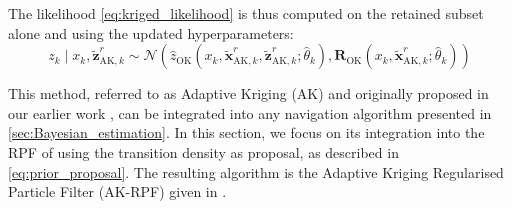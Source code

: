 The likelihood \eqref{eq:kriged_likelihood} is thus computed on the retained subset alone and using the updated hyperparameters:
\begin{equation}
	z_k\mid x_k,\tilde{\mathbf{z}}_{\mathrm{AK},k}^r\sim\mathcal{N}\left(\hat{z}_{\mathrm{OK}}\left(x_k,\tilde{\mathbf{x}}_{\mathrm{AK},k}^r,\tilde{\mathbf{z}}_{\mathrm{AK},k}^r;\hat{\theta}_k\right),\mathbf{R}_{\mathrm{OK}}\left(x_k,\tilde{\mathbf{x}}_{\mathrm{AK},k}^r;\hat{\theta}_k\right)\right)\label{eq:AK_likelihood}
\end{equation}

This method, referred to as Adaptive Kriging (AK) and originally proposed in our earlier work \cite{bib:AK-PF}, can be integrated into any navigation algorithm presented in \cref{sec:Bayesian_estimation}. In this section, we focus on its integration into the RPF of  using the transition density as proposal, as described in \eqref{eq:prior_proposal}. The resulting algorithm is the Adaptive Kriging Regularised Particle Filter (AK-RPF) given in .

